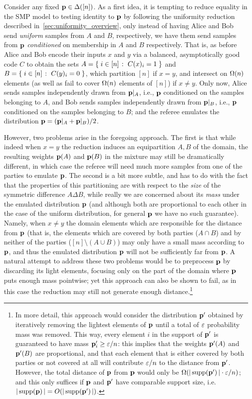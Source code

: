 Consider any fixed $\mathbf{p}\in\Delta\!\left([n]\right)$. As a first idea, it is tempting to reduce equality in the SMP model to testing identity to $\mathbf{p}$ by following the uniformity reduction described in~\cref{sec:uniformity_overview}, only instead of having Alice and Bob send \emph{uniform} samples from $A$ and $B$, respectively, we have them send samples from $\mathbf{p}$ \emph{conditioned} on membership in $A$ and $B$ respectively. That is, as before Alice and Bob encode their inputs $x$ and $y$ via a balanced, asymptotically good code $C$ to obtain the sets $A = \left\{\;  i\in[n]  \;\colon\;  C(x)_i = 1 \; \right\}$ and $B = \left\{\;  i\in[n]  \;\colon\;  C(y)_i = 0 \; \right\}$, which partition $[n]$ if $x=y$, and intersect on $\bigOmega{n}$ elements (as well as fail to cover $\bigOmega{n}$ elements of $[n]$) if $x \neq y$. Only now, Alice sends samples independently drawn from $\mathbf{p}|_A$, i.e., $\mathbf{p}$ conditioned on the samples belonging to $A$, and Bob sends samples independently drawn from $\mathbf{p}|_B$, i.e., $\mathbf{p}$ conditioned on the samples belonging to $B$; and the referee emulates the distribution $\mathbf{p} = (\mathbf{p}|_A + \mathbf{p}|_B)/2$.

However, two problems arise in the foregoing approach. The first is that while indeed when $x=y$ the reduction induces an equipartition $A,B$ of the domain, the resulting weights $\mathbf{p}(A)$ and $\mathbf{p}(B)$ in the mixture may still be dramatically different, in which case the referee will need much more samples from one of the parties to emulate $\mathbf{p}$. The second is a bit more subtle, and has to do with the fact that the properties of this partitioning are with respect to the \emph{size} of the symmetric difference $A\Delta B$, while really we are concerned about its \emph{mass} under the emulated distribution $\mathbf{p}$ (and although both are proportional to each other in the case of the uniform distribution, for general $\mathbf{p}$ we have no such guarantee). Namely, when $x \neq y$ the domain elements which are responsible for the  distance from $\mathbf{p}$ (that is, the elements which are covered by both parties ($A\cap B$) and by neither of the parties ($[n] \setminus (A\cup B)$) may only have a small mass according to $\mathbf{p}$, and thus the emulated distribution $\mathbf{p}$ will not be sufficiently far from $\mathbf{p}$. A natural attempt to address these two problems would be to preprocess $\mathbf{p}$ by discarding its light elements, focusing only on the part of the domain where $\mathbf{p}$ puts enough mass pointwise; yet this approach can also be shown to fail, as in this case the reduction may still not generate enough distance.\footnote{In more detail, this approach would consider the distribution $\mathbf{p}'$ obtained by iteratively removing the lightest elements of $\mathbf{p}$ until a total of $\varepsilon$ probability mass was removed. This way, every element $i$ in the support of $\mathbf{p}'$ is guaranteed to have mass $\mathbf{p}'_i \geq \varepsilon/n$: this implies that the weights $\mathbf{p}'(A)$ and $\mathbf{p}'(B)$ are proportional, and that each element that is either covered by both parties or not covered at all will contribute $\varepsilon/n$ to the distance from $\mathbf{p}'$. However, the total distance of $\mathbf{p}$ from $\mathbf{p}$ would only be $\bigOmega{|\supp{\p'}| \cdot \eps/n}$; and this only suffices if $\mathbf{p}$ and $\mathbf{p}'$ have comparable support size, i.e. $|\supp{\p}| = \bigO{|\supp{\p'}|}$.}

